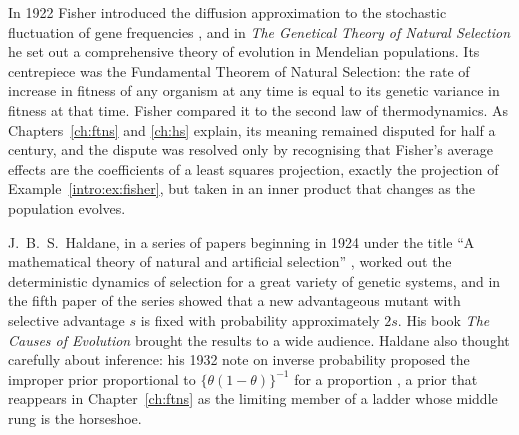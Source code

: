 In 1922 Fisher introduced the diffusion approximation to the stochastic fluctuation of gene
frequencies \citep{intro:fisher1922}, and in \emph{The Genetical Theory of Natural Selection}
\citep{intro:fisher1930} he set out a comprehensive theory of evolution in Mendelian populations.
Its centrepiece was the Fundamental Theorem of Natural Selection: the rate of increase in fitness
of any organism at any time is equal to its genetic variance in fitness at that time. Fisher
compared it to the second law of thermodynamics. As Chapters~\ref{ch:ftns} and \ref{ch:hs}
explain, its meaning remained disputed for half a century, and the dispute was resolved only by
recognising that Fisher's average effects are the coefficients of a least squares projection,
exactly the projection of Example~\ref{intro:ex:fisher}, but taken in an inner product that
changes as the population evolves.

J.~B.~S.\ Haldane, in a series of papers beginning in 1924 under the title ``A mathematical theory
of natural and artificial selection'' \citep{intro:haldane1924}, worked out the deterministic
dynamics of selection for a great variety of genetic systems, and in the fifth paper of the series
\citep{intro:haldane1927} showed that a new advantageous mutant with selective advantage $s$ is
fixed with probability approximately $2s$. His book \emph{The Causes of Evolution}
\citep{intro:haldane1932} brought the results to a wide audience. Haldane also thought carefully
about inference: his 1932 note on inverse probability proposed the improper prior proportional to
$\{\theta(1-\theta)\}^{-1}$ for a proportion \citep{intro:haldane1932prior}, a prior that
reappears in Chapter~\ref{ch:ftns} as the limiting member of a ladder whose middle rung is the
horseshoe.

